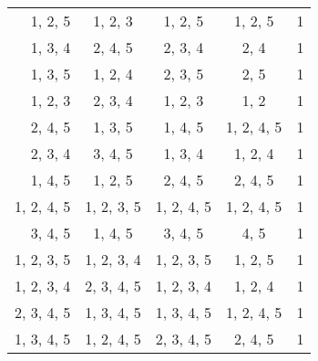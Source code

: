 \begin{solution}
\begin{enumerate}[(a)]
\begin{tabular}[t]{r c c c r}
                1, 2, 5 & 1, 2, 3 & 1, 2, 5 & 1, 2, 5 & 1\\
                1, 3, 4 & 2, 4, 5 & 2, 3, 4 & 2, 4 & 1\\
                1, 3, 5 & 1, 2, 4 & 2, 3, 5 & 2, 5 & 1\\
                1, 2, 3 & 2, 3, 4 & 1, 2, 3 & 1, 2 & 1\\
                2, 4, 5 & 1, 3, 5 & 1, 4, 5 & 1, 2, 4, 5 & 1\\
                2, 3, 4 & 3, 4, 5 & 1, 3, 4 & 1, 2, 4 & 1\\
                1, 4, 5 & 1, 2, 5 & 2, 4, 5 & 2, 4, 5 & 1\\
                1, 2, 4, 5 & 1, 2, 3, 5 & 1, 2, 4, 5 & 1, 2, 4, 5 & 1\\
                3, 4, 5 & 1, 4, 5 & 3, 4, 5 & 4, 5 & 1\\
                1, 2, 3, 5 & 1, 2, 3, 4 & 1, 2, 3, 5 & 1, 2, 5 & 1\\
                1, 2, 3, 4 & 2, 3, 4, 5 & 1, 2, 3, 4 & 1, 2, 4 & 1\\
                2, 3, 4, 5 & 1, 3, 4, 5 & 1, 3, 4, 5 & 1, 2, 4, 5 & 1\\
                1, 3, 4, 5 & 1, 2, 4, 5 & 2, 3, 4, 5 & 2, 4, 5 & 1
           \end{tabular}


\end{enumerate}
\end{solution}
